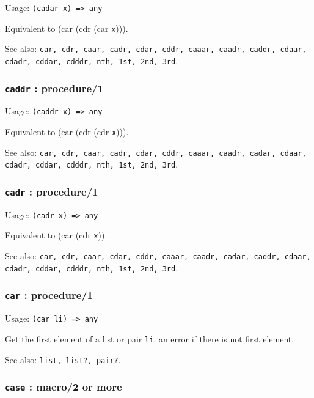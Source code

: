 \documentclass[
]{article}
\newcommand{\passthrough}[1]{#1}
\begin{document}
Usage: \passthrough{\lstinline!(cadar x) => any!}

Equivalent to (car (cdr (car \passthrough{\lstinline!x!}))).

See also:
\passthrough{\lstinline!car, cdr, caar, cadr, cdar, cddr, caaar, caadr, caddr, cdaar, cdadr, cddar, cdddr, nth, 1st, 2nd, 3rd!}.

\hypertarget{caddr-procedure1}{%
\subsubsection{\texorpdfstring{\texttt{caddr} :
procedure/1}{caddr : procedure/1}}\label{caddr-procedure1}}

Usage: \passthrough{\lstinline!(caddr x) => any!}

Equivalent to (car (cdr (cdr \passthrough{\lstinline!x!}))).

See also:
\passthrough{\lstinline!car, cdr, caar, cadr, cdar, cddr, caaar, caadr, cadar, cdaar, cdadr, cddar, cdddr, nth, 1st, 2nd, 3rd!}.

\hypertarget{cadr-procedure1}{%
\subsubsection{\texorpdfstring{\texttt{cadr} :
procedure/1}{cadr : procedure/1}}\label{cadr-procedure1}}

Usage: \passthrough{\lstinline!(cadr x) => any!}

Equivalent to (car (cdr \passthrough{\lstinline!x!})).

See also:
\passthrough{\lstinline!car, cdr, caar, cdar, cddr, caaar, caadr, cadar, caddr, cdaar, cdadr, cddar, cdddr, nth, 1st, 2nd, 3rd!}.

\hypertarget{car-procedure1}{%
\subsubsection{\texorpdfstring{\texttt{car} :
procedure/1}{car : procedure/1}}\label{car-procedure1}}

Usage: \passthrough{\lstinline!(car li) => any!}

Get the first element of a list or pair \passthrough{\lstinline!li!}, an
error if there is not first element.

See also: \passthrough{\lstinline!list, list?, pair?!}.

\hypertarget{case-macro2-or-more}{%
\subsubsection{\texorpdfstring{\texttt{case} : macro/2 or
more}{case : macro/2 or more}}\label{case-macro2-or-more}}
\end{document}
